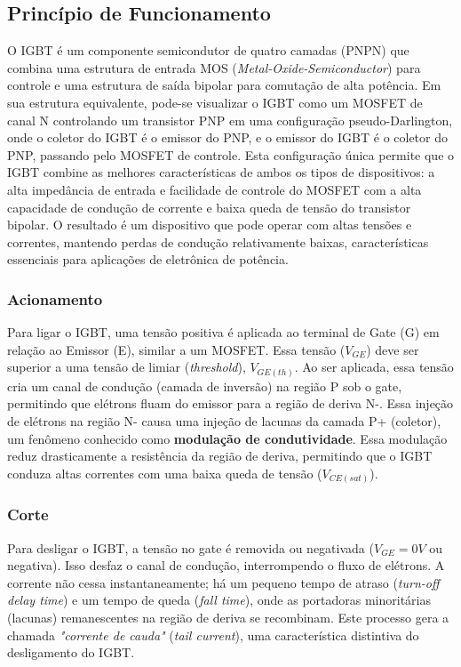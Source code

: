 \documentclass[12pt]{article}
\begin{document}
        \subsection{Princípio de Funcionamento}
        O IGBT é um componente semicondutor de quatro camadas (PNPN) que combina uma estrutura de entrada MOS (\textit{Metal-Oxide-Semiconductor}) para controle e uma estrutura de saída bipolar para comutação de alta potência. Em sua estrutura equivalente, pode-se visualizar o IGBT como um MOSFET de canal N controlando um transistor PNP em uma configuração pseudo-Darlington, onde o coletor do IGBT é o emissor do PNP, e o emissor do IGBT é o coletor do PNP, passando pelo MOSFET de controle. Esta configuração única permite que o IGBT combine as melhores características de ambos os tipos de dispositivos: a alta impedância de entrada e facilidade de controle do MOSFET com a alta capacidade de condução de corrente e baixa queda de tensão do transistor bipolar. O resultado é um dispositivo que pode operar com altas tensões e correntes, mantendo perdas de condução relativamente baixas, características essenciais para aplicações de eletrônica de potência.

        \subsubsection{Acionamento} Para ligar o IGBT, uma tensão positiva é aplicada ao terminal de Gate (G) em relação ao Emissor (E), similar a um MOSFET. Essa tensão ($V_{GE}$) deve ser superior a uma tensão de limiar (\textit{threshold}), $V_{GE(th)}$. Ao ser aplicada, essa tensão cria um canal de condução (camada de inversão) na região P sob o gate, permitindo que elétrons fluam do emissor para a região de deriva N-. Essa injeção de elétrons na região N- causa uma injeção de lacunas da camada P+ (coletor), um fenômeno conhecido como \textbf{modulação de condutividade}. Essa modulação reduz drasticamente a resistência da região de deriva, permitindo que o IGBT conduza altas correntes com uma baixa queda de tensão ($V_{CE(sat)}$).

        \subsubsection{Corte} Para desligar o IGBT, a tensão no gate é removida ou negativada ($V_{GE} = 0V$ ou negativa). Isso desfaz o canal de condução, interrompendo o fluxo de elétrons. A corrente não cessa instantaneamente; há um pequeno tempo de atraso (\textit{turn-off delay time}) e um tempo de queda (\textit{fall time}), onde as portadoras minoritárias (lacunas) remanescentes na região de deriva se recombinam. Este processo gera a chamada \textit{"corrente de cauda"} (\textit{tail current}), uma característica distintiva do desligamento do IGBT.
\end{document}

